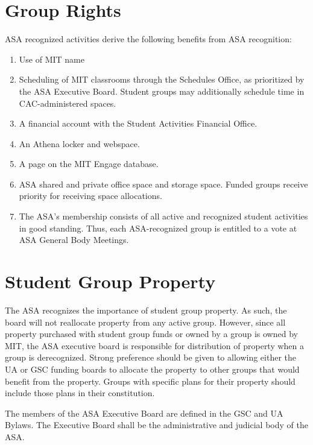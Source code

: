\documentclass[12pt]{article}
\begin{document}
\section{Group Rights}
ASA recognized activities derive the following benefits from ASA recognition:
\begin{enumerate}
    \item Use of MIT name
    
    \item Scheduling of MIT classrooms through the Schedules Office, as prioritized by the ASA
        Executive Board. Student groups may additionally schedule time in CAC-administered spaces.
    
    \item A financial account with the Student Activities Financial Office.
    
    \item An Athena locker and webspace.
    
    \item A page on the MIT Engage database.

    \item ASA shared and private office space and storage space. Funded groups receive priority
        for receiving space allocations.

    \item The ASA's membership consists of all active and recognized student activities in good
        standing.
    Thus, each ASA-recognized group is entitled to a vote at ASA General Body Meetings.
\end{enumerate}

\section{Student Group Property}
The ASA recognizes the importance of student group property.
As such, the board will not reallocate property from any active group.
However, since all property purchased with student group funds or owned by a group is owned by MIT,
    the ASA executive board is responsible for distribution of property when a group is derecognized.
Strong preference should be given to allowing either the UA or GSC funding boards to allocate the
    property to other groups that would benefit from the property.
Groups with specific plans for their property should include those plans in their constitution.


\label{asa_exec}
The members of the ASA Executive Board are defined in the GSC and UA Bylaws.
The Executive Board shall be the administrative and judicial body of the ASA.
\end{document}
